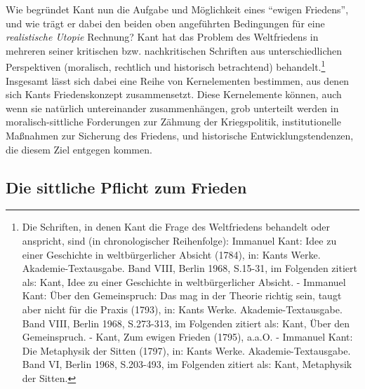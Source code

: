 \documentclass[12pt,a4paper,ngerman]{article}
\begin{document}
Wie begründet Kant nun die Aufgabe und Möglichkeit eines "`ewigen
Friedens"', und wie trägt er dabei den beiden oben angeführten
Bedingungen für eine {\em realistische Utopie} Rechnung? Kant hat das
Problem des Weltfriedens in mehreren seiner kritischen bzw.
nachkritischen Schriften aus unterschiedlichen Perspektiven
(moralisch, rechtlich und historisch betrachtend)
behandelt.\footnote{Die Schriften, in denen Kant die Frage des
  Weltfriedens behandelt oder anspricht, sind (in chronologischer
  Reihenfolge): Immanuel Kant: Idee zu einer Geschichte in
  weltbürgerlicher Absicht (1784), in: Kants Werke.
  Akademie-Textausgabe. Band VIII, Berlin 1968, S.15-31, im Folgenden
  zitiert als: Kant, Idee zu einer Geschichte in weltbürgerlicher
  Absicht. - Immanuel Kant: Über den Gemeinspruch: Das mag in der
  Theorie richtig sein, taugt aber nicht für die Praxis (1793), in:
  Kants Werke.  Akademie-Textausgabe. Band VIII, Berlin 1968,
  S.273-313, im Folgenden zitiert als: Kant, Über den Gemeinspruch. -
  Kant, Zum ewigen Frieden (1795), a.a.O. - Immanuel Kant: Die
  Metaphysik der Sitten (1797), in: Kants Werke.
  Akademie-Textausgabe.  Band VI, Berlin 1968, S.203-493, im Folgenden
  zitiert als: Kant, Metaphysik der Sitten.}  Insgesamt lässt sich
dabei eine Reihe von Kernelementen bestimmen, aus denen sich Kants
Friedenskonzept zusammensetzt. Diese Kernelemente können, auch wenn
sie natürlich untereinander zusammenhängen, grob unterteilt werden in
moralisch-sittliche Forderungen zur Zähmung der Kriegspolitik,
institutionelle Maßnahmen zur Sicherung des Friedens, und historische
Entwicklungstendenzen, die diesem Ziel entgegen kommen.

\subsection{Die sittliche Pflicht zum Frieden}
\end{document}
